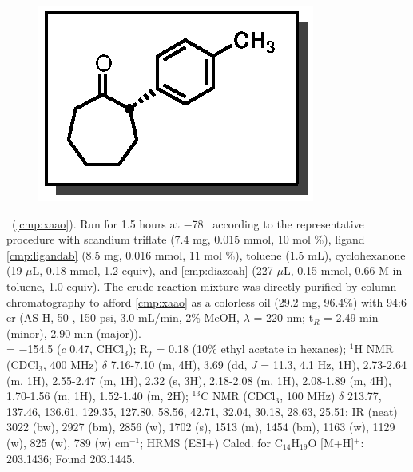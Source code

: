 \pagebreak
\begin{figure}
  \vspace{-22pt}
  \begin{center}
    \includegraphics[scale=0.8]{chp_asymmetric/images/xaao}
  \end{center}
  \vspace{-30pt}
\end{figure}\noindent \textbf{\CMPxaao}\ (\ref{cmp:xaao}). Run for 1.5 hours
at $-$78 \degc\  according to the representative procedure with scandium triflate (7.4
mg, 0.015 mmol, 10 mol \%), ligand \ref{cmp:ligandab} (8.5 mg, 0.016 mmol, 11
mol \%), toluene (1.5 mL), cyclohexanone (19 $\mu$L, 0.18 mmol, 1.2 equiv), and
\ref{cmp:diazoah} (227 $\mu$L, 0.15 mmol, 0.66 M in toluene, 1.0 equiv). The
crude reaction mixture was directly purified by column chromatography to afford
\ref{cmp:xaao} as a colorless oil (29.2 mg, 96.4\%) with 94:6 er (AS-H, 50
\degc, 150 psi, 3.0 mL/min, 2\% MeOH, $\lambda$ = 220 nm; t$_R$ = 2.49 min
(minor), 2.90 min (major)).\\
\noindent  \rotation = $-$154.5 ($c$ 0.47, CHCl$_3$); R$_f$ = 0.18 (10\% ethyl
acetate in hexanes); $^1$H NMR (CDCl$_3$, 400 MHz) $\delta$ 7.16-7.10 (m, 4H), 3.69 (dd, \textit{J} = 11.3, 4.1 Hz, 1H), 2.73-2.64 (m, 1H), 2.55-2.47 (m, 1H), 2.32 (s,
3H), 2.18-2.08 (m, 1H), 2.08-1.89 (m, 4H), 1.70-1.56 (m, 1H), 1.52-1.40 (m, 2H); $^{13}$C NMR (CDCl$_3$, 100 MHz) $\delta$ 213.77, 137.46, 136.61, 129.35, 127.80, 58.56, 42.71, 32.04, 30.18, 28.63, 25.51; IR (neat) 3022 (bw), 2927 (bm), 2856 (w), 1702 (s), 1513 (m), 1454 (bm), 1163 (w), 1129 (w), 825 (w), 789 (w) cm$^{-1}$; HRMS (ESI+) Calcd. for C$_{14}$H$_{19}$O [M+H]$^+$: 203.1436; Found 203.1445.
